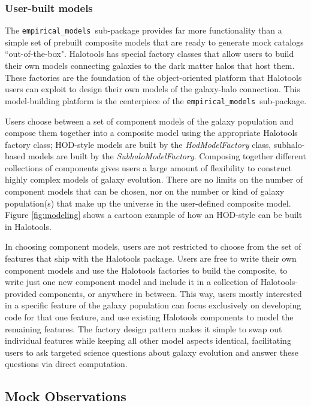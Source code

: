 \documentclass[twocolumn, tighten]{aastex6}
\newcommand{\emodels}{{\tt empirical\_models }}
\begin{document}
\subsubsection{User-built models}
\label{subsubsection:userbuiltmodels}

The \emodels sub-package provides far more functionality than a simple set of prebuilt composite models that are ready to generate mock catalogs ``out-of-the-box". Halotools has special factory classes that allow users to build their own models connecting galaxies to the dark matter halos that host them. These factories are the foundation of the object-oriented platform that Halotools users can exploit to design their own models of the galaxy-halo connection. This model-building platform is the centerpiece of the \emodels sub-package.

Users choose between a set of component models of the galaxy population and compose them together into a composite model using the appropriate Halotools factory class; HOD-style models are built by the {\em HodModelFactory} class, subhalo-based models are built by the {\em SubhaloModelFactory}. Composing together different collections of components gives users a large amount of flexibility to construct highly complex models of galaxy evolution. There are no limits on the number of component models that can be chosen, nor on the number or kind of galaxy population(s) that make up the universe in the user-defined composite model. Figure \ref{fig:modeling} shows a cartoon example of how an HOD-style can be built in Halotools. 

In choosing component models, users are not restricted to choose from the set of features that ship with the Halotools package. Users are free to write their own component models and use the Halotools factories to build the composite, to write just one new component model and include it in a collection of Halotools-provided components, or anywhere in between. This way, users mostly interested in a specific feature of the galaxy population can focus exclusively on developing code for that one feature, and use existing Halotools components to model the remaining features. The factory design pattern makes it simple to swap out individual features while keeping all other model aspects identical, facilitating users to ask targeted science questions about galaxy evolution and answer these questions via direct computation. 

\subsection{Mock Observations}
\label{subsection:mock_observables}
\end{document}
